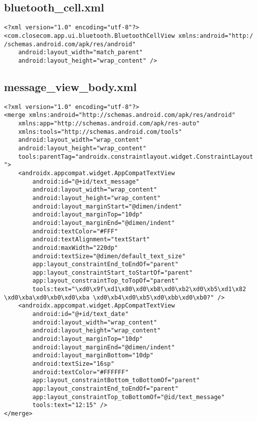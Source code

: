 \documentclass[listing]{espd}
\begin{document}
\subsection{bluetooth\_cell.xml}
\begin{verbatim}
<?xml version="1.0" encoding="utf-8"?>
<com.closecom.app.ui.bluetooth.BluetoothCellView xmlns:android="http:/
/schemas.android.com/apk/res/android"
    android:layout_width="match_parent"
    android:layout_height="wrap_content" />
\end{verbatim}

\subsection{message\_view\_body.xml}
\begin{verbatim}
<?xml version="1.0" encoding="utf-8"?>
<merge xmlns:android="http://schemas.android.com/apk/res/android"
    xmlns:app="http://schemas.android.com/apk/res-auto"
    xmlns:tools="http://schemas.android.com/tools"
    android:layout_width="wrap_content"
    android:layout_height="wrap_content"
    tools:parentTag="androidx.constraintlayout.widget.ConstraintLayout
">
    <androidx.appcompat.widget.AppCompatTextView
        android:id="@+id/text_message"
        android:layout_width="wrap_content"
        android:layout_height="wrap_content"
        android:layout_marginStart="@dimen/indent"
        android:layout_marginTop="10dp"
        android:layout_marginEnd="@dimen/indent"
        android:textColor="#FFF"
        android:textAlignment="textStart"
        android:maxWidth="220dp"
        android:textSize="@dimen/default_text_size"
        app:layout_constraintEnd_toEndOf="parent"
        app:layout_constraintStart_toStartOf="parent"
        app:layout_constraintTop_toTopOf="parent"
        tools:text="\xd0\x9f\xd1\x80\xd0\xb8\xd0\xb2\xd0\xb5\xd1\x82 \xd0\xba\xd0\xb0\xd0\xba \xd0\xb4\xd0\xb5\xd0\xbb\xd0\xb0?" />
    <androidx.appcompat.widget.AppCompatTextView
        android:id="@+id/text_date"
        android:layout_width="wrap_content"
        android:layout_height="wrap_content"
        android:layout_marginTop="10dp"
        android:layout_marginEnd="@dimen/indent"
        android:layout_marginBottom="10dp"
        android:textSize="16sp"
        android:textColor="#FFFFFF"
        app:layout_constraintBottom_toBottomOf="parent"
        app:layout_constraintEnd_toEndOf="parent"
        app:layout_constraintTop_toBottomOf="@id/text_message"
        tools:text="12:15" />
</merge>
\end{verbatim}
\end{document}
